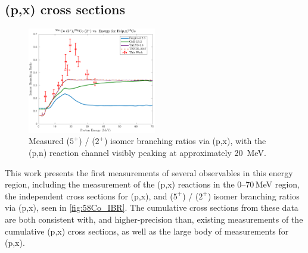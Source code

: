 \subsection{(p,x) cross sections}


\begin{figure}[h]
 \centering
 \includegraphics[width=0.5\textwidth]{./figures/58Co_IBR.pdf}
 \caption{Measured  ($5^+$) /   ($2^+$)  isomer branching ratios via (p,x), with the (p,n) reaction channel visibly peaking at approximately \mbox{20 MeV}.}
 \label{fig:58Co_IBR}
\end{figure}





This work presents the first measurements of several observables in 
this energy region, including the measurement of the  (p,x) reactions in the 0--70\,MeV region, 
the independent cross sections for      (p,x), and  ($5^+$) /   ($2^+$)  isomer branching ratios via (p,x), seen in \autoref{fig:58Co_IBR}. 
The cumulative cross sections from these data are both consistent with, and higher-precision than, existing measurements of the cumulative (p,x) cross sections, as well as the large body of measurements for (p,x).


